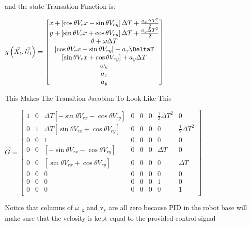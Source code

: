 \documentclass[11pt]{article}
\begin{document}
and the state Transation Function is:

\begin{math}
g\left( \vec{X_t}, \vec{U_t} \right )  =
\begin{bmatrix}
x + \left[ \cos{\theta}V_rx - \sin{\theta}V_{ry} \right] \Delta T + \frac{ a_x {\Delta T}^2 }{ 2 } \\
y + \left[ \sin{\theta}V_rx + \cos{\theta}V_{ry} \right] \Delta T + \frac{ a_y {\Delta T}^2 }{ 2 } \\
\theta + \omega \Delta T \\
\left[ \cos{\theta}V_rx - \sin{\theta}V_{ry} \right] + a_x\DeltaT \\
\left[ \sin{\theta}V_rx + \cos{\theta}V_{ry} \right] + a_y\Delta T \\
\omega_u \\
a_x \\
a_y \\
\end{bmatrix}
\end{math}





This Makes The Transition Jacobian To Look Like This 

\begin{math}
\vec{G} =
\begin{bmatrix}
1 & 0 & \Delta T \left[ -\sin{\theta} V_{rx} - \cos{\theta} V_{ry} \right] & 0 & 0 & 0 & \frac{ 1 }{ 2 } \Delta T ^ 2  & 0\\
0 & 1 & \Delta T \left[ \sin{\theta} V_{rx} + \cos{\theta} V_{ry}  \right] & 0 & 0 & 0 & 0 & \frac{ 1 }{ 2 } \Delta T ^ 2 \\
0 & 0 & 1 & 0 & 0 & 0 & 0 & 0 \\
0 & 0 & \left[ -\sin{\theta} V_{rx} - \cos{\theta} V_{ry} \right] & 0 & 0 & 0 & \Delta T & 0 \\
0 & 0 & \left[ \sin{\theta} V_{rx} + \cos{\theta} V_{ry}  \right] & 0 & 0 & 0 & 0 & \Delta T \\
0 & 0 & 0 & 0 & 0 & 0 & 0 & 0 \\
0 & 0 & 0 & 0 & 0 & 0 & 1 & 0 \\
0 & 0 & 0 & 0 & 0 & 0 & 0 & 1 \\
\end{bmatrix}

\end{math}


Notice that columns of \(\omega\) \v\textsubscript{x} and v\textsubscript{y} are all zero because PID in the robot base will make sure that the velosity is kept equal to the provided control signal
\end{document}
